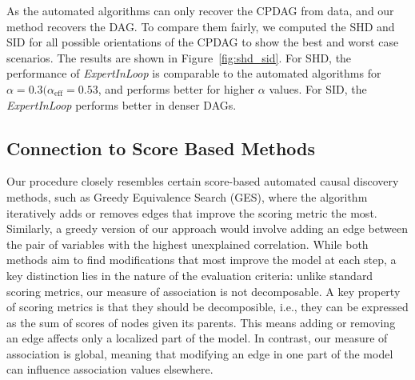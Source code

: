 \documentclass{uai2025} %
\begin{document}

As the automated algorithms can only recover the CPDAG from data, and our
method recovers the DAG. To compare them fairly, we computed the SHD and SID
for all possible orientations of the CPDAG to show the best and worst case
scenarios. The results are shown in Figure~\ref{fig:shd_sid}. For SHD, the
performance of \emph{ExpertInLoop} is comparable to the automated algorithms
for $ \alpha = 0.3 (\alpha_{\textrm{eff}} = 0.53 $, and performs better for
higher $ \alpha $ values. For SID, the \emph{ExpertInLoop} performs better in
denser DAGs.

% 	
% 	
% 

\subsection{Connection to Score Based Methods}

Our procedure closely resembles certain score-based automated causal discovery
methods, such as Greedy Equivalence Search (GES), where the algorithm
iteratively adds or removes edges that improve the scoring metric the most.
Similarly, a greedy version of our approach would involve adding an edge
between the pair of variables with the highest unexplained correlation. While
both methods aim to find modifications that most improve the model at each
step, a key distinction lies in the nature of the evaluation criteria: unlike
standard scoring metrics, our measure of association is not decomposable. A key
property of scoring metrics is that they should be decomposible, i.e., they can
be expressed as the sum of scores of nodes given its parents. This means adding
or removing an edge affects only a localized part of the model. In contrast,
our measure of association is global, meaning that modifying an edge in one
part of the model can influence association values elsewhere.
\end{document}
